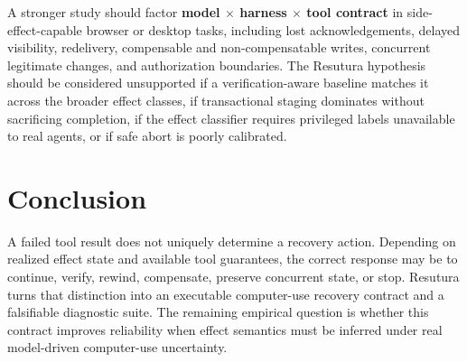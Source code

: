 \documentclass{article}
\begin{document}
A stronger study should factor \textbf{model $\times$ harness $\times$ tool contract} in side-effect-capable browser or desktop tasks, including lost acknowledgements, delayed visibility, redelivery, compensable and non-compensatable writes, concurrent legitimate changes, and authorization boundaries. The Resutura hypothesis should be considered unsupported if a verification-aware baseline matches it across the broader effect classes, if transactional staging dominates without sacrificing completion, if the effect classifier requires privileged labels unavailable to real agents, or if safe abort is poorly calibrated.

\section{Conclusion}
A failed tool result does not uniquely determine a recovery action. Depending on realized effect state and available tool guarantees, the correct response may be to continue, verify, rewind, compensate, preserve concurrent state, or stop. Resutura turns that distinction into an executable computer-use recovery contract and a falsifiable diagnostic suite. The remaining empirical question is whether this contract improves reliability when effect semantics must be inferred under real model-driven computer-use uncertainty.
\end{document}
